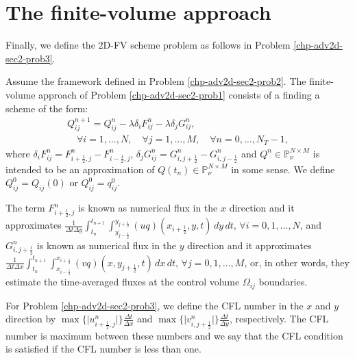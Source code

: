 \section{The finite-volume approach}
\label{sec:fv-2d}
Finally, we define the 2D-FV scheme problem as follows in Problem \ref{chp-adv2d-sec2-prob3}.
\begin{prob}[2D-FV scheme]
	\label{chp-adv2d-sec2-prob3}
	Assume the framework defined in Problem \ref{chp-adv2d-sec2-prob2}.
	The finite-volume approach of Problem \ref{chp-adv2d-sec2-prob1}
	consists of a finding a scheme of the form:
	\begin{align}
		\label{chp-adv2d-2dfv}
		{Q}_{ij}^{n+1} =  {Q}_{ij}^{n} - {\lambda} \delta_i {F}_{ij}^{n} - {\lambda} \delta_j {G}_{ij}^{n},
		\\ \nonumber \quad \forall i = 1, \ldots, N, \quad \forall j = 1, \ldots, M,
		\quad \forall n = 0, \ldots, N_T-1,
	\end{align}
	where $ \delta_i F_{ij}^n =
    {F}_{i+\frac{1}{2},j}^{n} 
    - {F}_{i-\frac{1}{2},j}^{n}$,
    $ \delta_j G_{ij}^n =
    {G}_{i,j+\frac{1}{2}}^{n} 
    - {G}_{i,j-\frac{1}{2}}^{n}$ 
    and ${Q}^{n}\in \mathbb{P}^{N\times M}_{\nu}$ is intended to be an approximation
	of ${Q}(t_{n})\in \mathbb{P}^{N\times M}_{\nu}$ in some sense. We define ${Q}_{ij}^{0} = {Q}_{ij}(0)$ or
	${Q}_{ij}^{0} = {q}^0_{ij}$.
    
    The term ${F}_{i+\frac{1}{2}, j}^{n}$ is known as numerical flux in the 
    $x$ direction and it approximates
	$\frac{1}{\Delta t \Delta y}\int_{t_n}^{t_{n+1}} 
    \int_{y_{j-\frac{1}{2}}}^{y_{j+\frac{1}{2}}} 
    (uq)(x_{i+\frac{1}{2}}, y, t) \,dy \,dt $,
    $\forall i = 0, 1, \ldots, N$, and 
	${G}_{i, j+\frac{1}{2}}^{n}$ is known as numerical flux in the 
    $y$ direction and it approximates
	$\frac{1}{\Delta t \Delta x}\int_{t_n}^{t_{n+1}}  
    \int_{x_{i-\frac{1}{2}}}^{x_{i+\frac{1}{2}}}
    (vq)(x, y_{j+\frac{1}{2}}, t) \,dx \,dt $,
    $\forall j = 0, 1, \ldots, M$,
	or, in other words, they estimate the time-averaged
    fluxes at the control volume $\Omega_{ij}$ boundaries.
\end{prob}
\begin{remark}
For Problem \ref{chp-adv2d-sec2-prob3}, we define the CFL number in the $x$ and $y$ direction
by $\max \{{|u_{i+\frac{1}{2},j}^n}|\}\frac{\Delta t}{\Delta x}$ and 
$\max \{ {|v_{i,j+\frac{1}{2}}^n}|\}\frac{\Delta t}{\Delta y}$, respectively.
The CFL number is maximum between these numbers and we say that the CFL condition is
satisfied if the CFL number is less than one. 
\end{remark}

